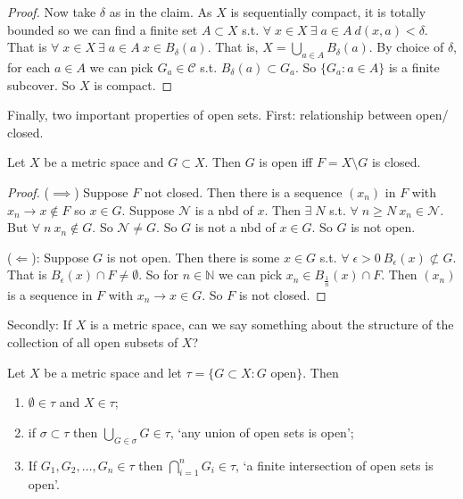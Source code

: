 \begin{proof}
    Now take $\delta$ as in the claim.
    As $X$ is sequentially compact, it is totally bounded so we can find a finite set $A \subset X$ s.t. $\forall \; x \in X \ \exists \; a \in A \ d(x, a) < \delta$.
    That is $\forall \; x \in X \ \exists \; a \in A \ x \in B_\delta(a)$.
    That is, $X = \bigcup_{a \in A} B_\delta(a)$.
    By choice of $\delta$, for each $a \in A$ we can pick $G_a \in \mathcal{C}$ s.t. $B_\delta(a) \subset G_a$.
    So $\{G_a : a \in A\}$ is a finite subcover.
    So $X$ is compact.
\end{proof} 

Finally, two important properties of open sets.
First: relationship between open/ closed.
\begin{proposition} \label{prp:25}
    Let $X$ be a metric space and $G \subset X$.
    Then $G$ is open iff $F = X \setminus G$ is closed.
\end{proposition} 

\begin{proof}
    ($\implies$) Suppose $F$ not closed.
    Then there is a sequence $(x_n)$ in $F$ with $x_n \to x \notin F$ so $x \in G$.
    Suppose $\mathcal{N}$ is a nbd of $x$.
    Then $\exists \; N$ s.t. $\forall \; n \geq N \ x_n \in \mathcal{N}$.
    But $\forall \; n \ x_n \notin G$.
    So $\mathcal{N} \neq G$.
    So $G$ is not a nbd of $x \in G$.
    So $G$ is not open.

    ($\Longleftarrow$): Suppose $G$ is not open.
    Then there is some $x \in G$ s.t. $\forall \; \epsilon > 0 \ B_\epsilon(x) \not\subset G$.
    That is $B_\epsilon(x) \cap F \neq \emptyset$.
    So for $n \in \mathbb{N}$ we can pick $x_n \in B_{\frac{1}{n}}(x) \cap F$.
    Then $(x_n)$ is a sequence in $F$ with $x_n \to x \in G$.
    So $F$ is not closed.
\end{proof} 

Secondly: If $X$ is a metric space, can we say something about the structure of the collection of all open subsets of $X$?

\begin{proposition} \label{prp:26}
    Let $X$ be a metric space and let $\tau = \{ G \subset X : G \text{ open}\}$.
    Then \begin{enumerate}
        \item $\emptyset \in \tau$ and $X \in \tau$;
        \item if $\sigma \subset \tau$ then $\bigcup_{G \in \sigma} G \in \tau$, `any union of open sets is open';
        \item If $G_1, G_2, \dots, G_n \in \tau$ then $\bigcap_{i = 1}^n G_i \in \tau$, `a finite intersection of open sets is open'.
    \end{enumerate} 
\end{proposition} 

